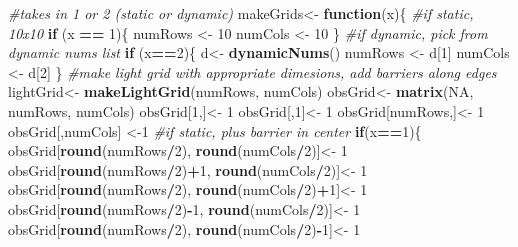 \documentclass[]{article}
\newenvironment{Shaded}{\begin{snugshade}}{\end{snugshade}}
\newcommand{\CommentTok}[1]{\textcolor[rgb]{0.56,0.35,0.01}{\textit{#1}}}
\newcommand{\ControlFlowTok}[1]{\textcolor[rgb]{0.13,0.29,0.53}{\textbf{#1}}}
\newcommand{\DecValTok}[1]{\textcolor[rgb]{0.00,0.00,0.81}{#1}}
\newcommand{\KeywordTok}[1]{\textcolor[rgb]{0.13,0.29,0.53}{\textbf{#1}}}
\newcommand{\NormalTok}[1]{#1}
\newcommand{\OperatorTok}[1]{\textcolor[rgb]{0.81,0.36,0.00}{\textbf{#1}}}
\newcommand{\OtherTok}[1]{\textcolor[rgb]{0.56,0.35,0.01}{#1}}
\newcommand{\StringTok}[1]{\textcolor[rgb]{0.31,0.60,0.02}{#1}}
\begin{document}
\begin{Shaded}
\begin{Highlighting}[]
\CommentTok{#takes in 1 or 2 (static or dynamic)}
\NormalTok{makeGrids<-}\StringTok{ }\ControlFlowTok{function}\NormalTok{(x)\{}
  \CommentTok{#if static, 10x10}
  \ControlFlowTok{if}\NormalTok{ (x }\OperatorTok{==}\StringTok{ }\DecValTok{1}\NormalTok{)\{}
\NormalTok{    numRows <-}\StringTok{ }\DecValTok{10}
\NormalTok{    numCols <-}\StringTok{ }\DecValTok{10}
\NormalTok{  \}}
  \CommentTok{#if dynamic, pick from dynamic nums list}
  \ControlFlowTok{if}\NormalTok{ (x}\OperatorTok{==}\DecValTok{2}\NormalTok{)\{}
\NormalTok{    d<-}\StringTok{ }\KeywordTok{dynamicNums}\NormalTok{()}
\NormalTok{  numRows <-}\StringTok{ }\NormalTok{d[}\DecValTok{1}\NormalTok{]}
\NormalTok{  numCols <-}\StringTok{ }\NormalTok{d[}\DecValTok{2}\NormalTok{]}
\NormalTok{  \}}
  \CommentTok{#make light grid with appropriate dimesions, add barriers along edges}
\NormalTok{  lightGrid<-}\StringTok{ }\KeywordTok{makeLightGrid}\NormalTok{(numRows, numCols)}
\NormalTok{  obsGrid<-}\StringTok{ }\KeywordTok{matrix}\NormalTok{(}\OtherTok{NA}\NormalTok{, numRows, numCols)}
\NormalTok{  obsGrid[}\DecValTok{1}\NormalTok{,]<-}\StringTok{ }\DecValTok{1}
\NormalTok{  obsGrid[,}\DecValTok{1}\NormalTok{]<-}\StringTok{ }\DecValTok{1}
\NormalTok{  obsGrid[numRows,]<-}\StringTok{ }\DecValTok{1}
\NormalTok{  obsGrid[,numCols] <-}\DecValTok{1}
  \CommentTok{#if static, plus barrier in center}
  \ControlFlowTok{if}\NormalTok{(x}\OperatorTok{==}\DecValTok{1}\NormalTok{)\{}
\NormalTok{    obsGrid[}\KeywordTok{round}\NormalTok{(numRows}\OperatorTok{/}\DecValTok{2}\NormalTok{), }\KeywordTok{round}\NormalTok{(numCols}\OperatorTok{/}\DecValTok{2}\NormalTok{)]<-}\StringTok{ }\DecValTok{1}
\NormalTok{    obsGrid[}\KeywordTok{round}\NormalTok{(numRows}\OperatorTok{/}\DecValTok{2}\NormalTok{)}\OperatorTok{+}\DecValTok{1}\NormalTok{, }\KeywordTok{round}\NormalTok{(numCols}\OperatorTok{/}\DecValTok{2}\NormalTok{)]<-}\StringTok{ }\DecValTok{1}
\NormalTok{    obsGrid[}\KeywordTok{round}\NormalTok{(numRows}\OperatorTok{/}\DecValTok{2}\NormalTok{), }\KeywordTok{round}\NormalTok{(numCols}\OperatorTok{/}\DecValTok{2}\NormalTok{)}\OperatorTok{+}\DecValTok{1}\NormalTok{]<-}\StringTok{ }\DecValTok{1}
\NormalTok{    obsGrid[}\KeywordTok{round}\NormalTok{(numRows}\OperatorTok{/}\DecValTok{2}\NormalTok{)}\OperatorTok{-}\DecValTok{1}\NormalTok{, }\KeywordTok{round}\NormalTok{(numCols}\OperatorTok{/}\DecValTok{2}\NormalTok{)]<-}\StringTok{ }\DecValTok{1}
\NormalTok{    obsGrid[}\KeywordTok{round}\NormalTok{(numRows}\OperatorTok{/}\DecValTok{2}\NormalTok{), }\KeywordTok{round}\NormalTok{(numCols}\OperatorTok{/}\DecValTok{2}\NormalTok{)}\OperatorTok{-}\DecValTok{1}\NormalTok{]<-}\StringTok{ }\DecValTok{1}

\end{Highlighting}
\end{Shaded}
\end{document}
